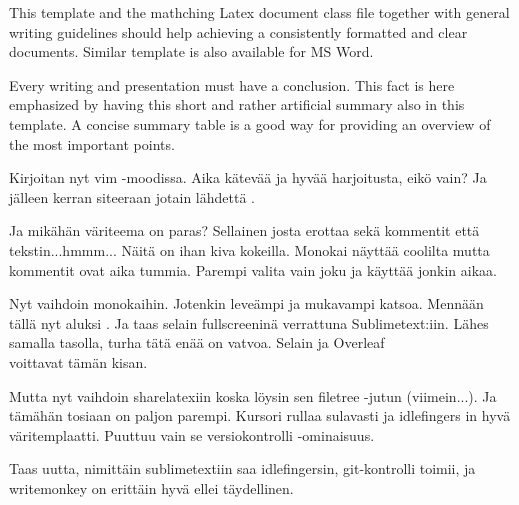 \documentclass[12pt,a4paper,finnish]{tutthesis}
\begin{document}
This template and the mathching Latex document class file together
with general writing guidelines should help achieving a consistently
formatted and clear documents. Similar template is also available for
MS Word.

Every writing and presentation must have a conclusion. This fact is
here emphasized by having this short and rather artificial summary
also in this template. A concise summary table is a good way for
providing an overview of the most important points.

Kirjoitan nyt vim -moodissa. Aika kätevää ja hyvää harjoitusta, eikö vain?
Ja jälleen kerran siteeraan jotain lähdettä \parencite{rubberwheel}.

Ja mikähän väriteema on paras? Sellainen josta erottaa sekä kommentit että tekstin...hmmm...
Näitä on ihan kiva kokeilla. Monokai näyttää coolilta mutta kommentit ovat
aika tummia. Parempi valita vain joku ja käyttää jonkin aikaa.

Nyt vaihdoin monokaihin. Jotenkin leveämpi ja mukavampi katsoa. Mennään
tällä nyt aluksi \parencite{wang2010143}. Ja taas selain fullscreeninä verrattuna
Sublimetext:iin. Lähes samalla tasolla, turha tätä enää on vatvoa. Selain ja Overleaf \\ voittavat
tämän kisan.

Mutta nyt vaihdoin sharelatexiin koska löysin sen filetree -jutun (viimein...).
Ja tämähän tosiaan on paljon parempi. Kursori rullaa sulavasti ja idlefingers in hyvä
väritemplaatti. Puuttuu vain se versiokontrolli -ominaisuus.

Taas uutta, nimittäin sublimetextiin saa idlefingersin, git-kontrolli
toimii, ja writemonkey on erittäin hyvä ellei täydellinen.



\newpage

\renewcommand{\bibname}{Lähteet}         %


%
%
\end{document}
